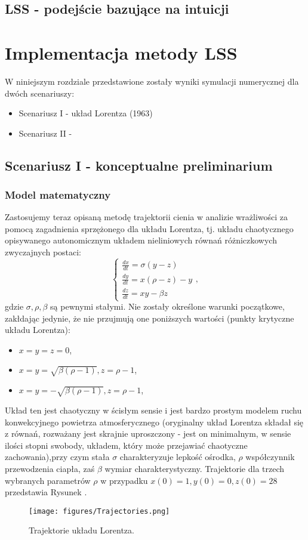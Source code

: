 \documentclass[12pt]{article}
\begin{document}
\subsection{LSS - podejście bazujące na intuicji}
\newpage
\section{Implementacja metody LSS}
W niniejszym rozdziale przedstawione zostały wyniki symulacji numerycznej dla dwóch scenariuszy:
\begin{itemize}
	\item Scenariusz I - układ Lorentza (1963)
	\item Scenariusz II - 
\end{itemize}
\subsection{Scenariusz I - konceptualne preliminarium}
\subsubsection{Model matematyczny}
Zastosujemy teraz opisaną metodę trajektorii cienia w analizie wrażliwości za pomocą zagadnienia sprzężonego dla układu Lorentza, tj. układu chaotycznego opisywanego autonomicznym układem nieliniowych równań różniczkowych zwyczajnych postaci:
\begin{equation}
\begin{cases} 
\frac{dx}{dt} = \sigma(y-z) \\ 
\frac{dy}{dt} = x(\rho-z)-y \\ 
\frac{dz}{dt} = xy-\beta z 
\end{cases},
\label{lorenz_eq}
\end{equation}
gdzie $ \sigma, \rho, \beta $ są pewnymi stałymi. Nie zostały określone warunki początkowe, zakłdając jedynie, że nie przujmują one poniższych wartości (punkty krytyczne układu Lorentza):
\begin{itemize}
	\item $ x = y = z = 0 $,
	\item $ x = y = \sqrt{\beta(\rho - 1)}, z = \rho - 1 $,
	\item $ x = y = -\sqrt{\beta(\rho - 1)}, z = \rho - 1 $,
\end{itemize}
Układ ten jest chaotyczny w ścisłym sensie i jest bardzo prostym modelem ruchu konwekcyjnego powietrza atmosferycznego (oryginalny układ Lorentza składał się z równań, rozważany jest skrajnie uproszczony - jest on minimalnym, w sensie ilości stopni swobody, układem, który może przejawiać chaotyczne zachowania),przy czym stała   $ \sigma $ charakteryzuje lepkość ośrodka, $ \rho $ współczynnik przewodzenia ciapła, zaś $ \beta $ wymiar charakterystyczny.\newline
Trajektorie dla trzech wybranych parametrów $ \rho $ w przypadku $ x(0) = 1, y(0) = 0, z(0) = 28 $ przedstawia Rysunek .
\begin{figure}[H]
	\texttt{[image: figures/Trajectories.png]} 
	\centering
	\caption{Trajektorie układu Lorentza.}
\end{figure}
\end{document}
